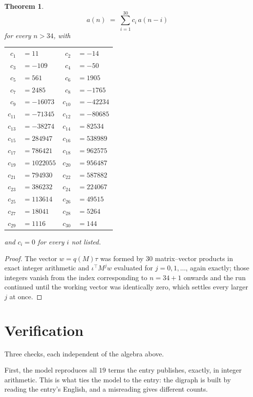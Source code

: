 \documentclass[11pt,a4paper]{article}
\theoremstyle{plain}
\newtheorem{theorem}{Theorem}
\theoremstyle{definition}
\begin{document}
\begin{theorem}
\[
a(n)\;=\;\sum_{i=1}^{30}c_i\,a(n-i)
\]
for every $n>34$, with
\begin{center}\footnotesize
\begin{tabular}{r@{\,}l@{\qquad}r@{\,}l}
$c_{1}$ & $=11$ & $c_{2}$ & $=-14$ \\
$c_{3}$ & $=-109$ & $c_{4}$ & $=-50$ \\
$c_{5}$ & $=561$ & $c_{6}$ & $=1905$ \\
$c_{7}$ & $=2485$ & $c_{8}$ & $=-1765$ \\
$c_{9}$ & $=-16073$ & $c_{10}$ & $=-42234$ \\
$c_{11}$ & $=-71345$ & $c_{12}$ & $=-80685$ \\
$c_{13}$ & $=-38274$ & $c_{14}$ & $=82534$ \\
$c_{15}$ & $=284947$ & $c_{16}$ & $=538989$ \\
$c_{17}$ & $=786421$ & $c_{18}$ & $=962575$ \\
$c_{19}$ & $=1022055$ & $c_{20}$ & $=956487$ \\
$c_{21}$ & $=794930$ & $c_{22}$ & $=587882$ \\
$c_{23}$ & $=386232$ & $c_{24}$ & $=224067$ \\
$c_{25}$ & $=113614$ & $c_{26}$ & $=49515$ \\
$c_{27}$ & $=18041$ & $c_{28}$ & $=5264$ \\
$c_{29}$ & $=1116$ & $c_{30}$ & $=144$ \\
\end{tabular}
\end{center}
and $c_i=0$ for every $i$ not listed.
\end{theorem}

\begin{proof}
The vector $w=q(M)\tau$ was formed by $30$ matrix--vector products in exact integer
arithmetic and $\iota^{\!\top}M^{j}w$ evaluated for $j=0,1,\dots$, again exactly; those
integers vanish from the index corresponding to $n=34+1$ onwards and the run continued
until the working vector was identically zero, which settles every larger $j$ at once.
\end{proof}

\section{Verification}

Three checks, each independent of the algebra above.

First, the model reproduces all $19$ terms the entry publishes, exactly, in integer
arithmetic. This is what ties the model to the entry: the digraph is built by reading the
entry's English, and a misreading gives different counts.
\end{document}
